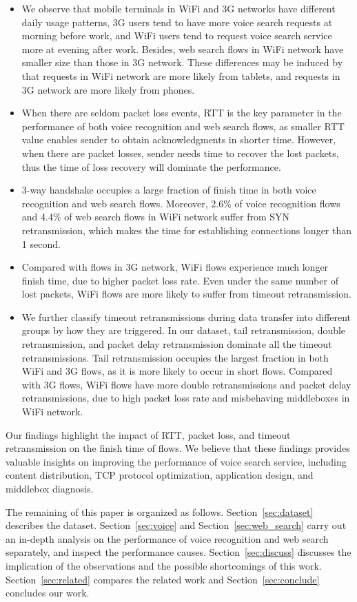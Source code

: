 \begin{itemize}
\item We observe that mobile terminals in WiFi and 3G networks have different daily usage patterns, 3G users tend to have more voice search requests at morning before work, and WiFi users tend to request voice search service more at evening after work. Besides, web search flows in WiFi network have smaller size than those in 3G network. These differences may be induced by that requests in WiFi network are more likely from tablets, and requests in 3G network are more likely from phones. 
\item When there are seldom packet loss events, RTT is the key parameter in the performance of both voice recognition and web search flows, as smaller RTT value enables sender to obtain acknowledgments in shorter time. However, when there are packet losses, sender needs time to recover the lost packets, thus the time of loss recovery will dominate the performance.
\item 3-way handshake occupies a large fraction of finish time in both voice recognition and web search flows. Moreover, 2.6\% of voice recognition flows and 4.4\% of web search flows in WiFi network suffer from SYN retransmission, which makes the time for establishing connections longer than 1 second. 
\item Compared with flows in 3G network, WiFi flows experience much longer finish time, due to higher packet loss rate. Even under the same number of lost packets, WiFi flows are more likely to suffer from timeout retransmission.
\item We further classify timeout retransmissions during data transfer into different groups by how they are triggered. In our dataset, tail retransmission, double retransmission, and packet delay retransmission dominate all the timeout retransmissions. Tail retransmission occupies the largest fraction in both WiFi and 3G flows, as it is more likely to occur in short flows. Compared with 3G flows, WiFi flows have more double retransmissions and packet delay retransmissions, due to high packet loss rate and misbehaving middleboxes in WiFi network.
\end{itemize}

Our findings highlight the impact of RTT, packet loss, and timeout retransmission on the finish time of flows. We believe that these findings provides valuable insights on improving the performance of voice search service, including content distribution, TCP protocol optimization, application design, and middlebox diagnosis.

The remaining of this paper is organized as follows. Section~\ref{sec:dataset} describes the dataset. Section~\ref{sec:voice} and Section~\ref{sec:web_search} carry out an in-depth analysis on the performance of voice recognition and web search separately, and inspect the performance causes. Section~\ref{sec:discuss} discusses the implication of the observations and the possible shortcomings of this work. Section~\ref{sec:related} compares the related work and Section~\ref{sec:conclude} concludes our work. 